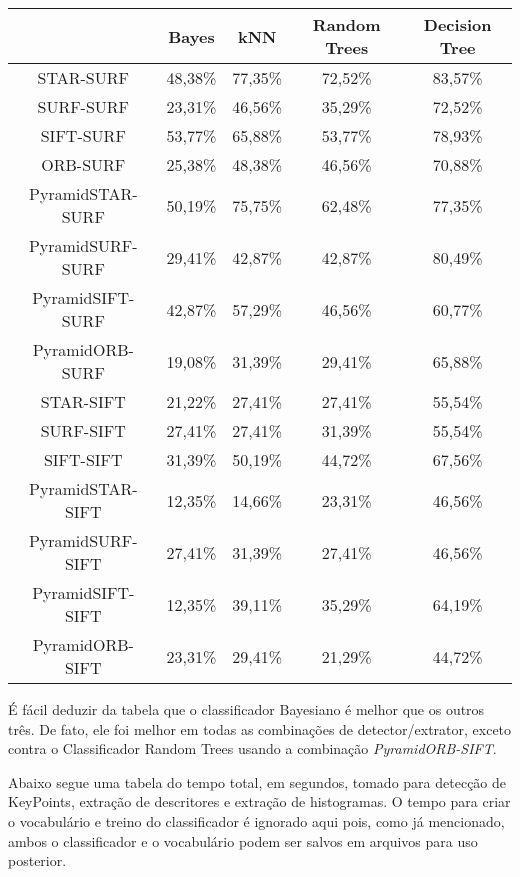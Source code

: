 \documentclass[a4paper,11pt]{article}
\begin{document}
  \vspace{15pt}
  \hspace{-25pt}
  \begin{tabular}{|c|c|c|c|c|}
    \hline
     & Bayes & kNN & Random Trees & Decision Tree \\
    \hline
        STAR-SURF & 48,38\% & 77,35\% & 72,52\% & 83,57\% \\
        SURF-SURF & 23,31\% & 46,56\% & 35,29\% & 72,52\% \\
        SIFT-SURF & 53,77\% & 65,88\% & 53,77\% & 78,93\%\\
        ORB-SURF & 25,38\% & 48,38\% & 46,56\% & 70,88\% \\
        PyramidSTAR-SURF & 50,19\% & 75,75\% & 62,48\% & 77,35\% \\
        PyramidSURF-SURF & 29,41\% & 42,87\% & 42,87\% & 80,49\% \\
        PyramidSIFT-SURF & 42,87\% & 57,29\% & 46,56\% & 60,77\% \\
        PyramidORB-SURF & 19,08\% & 31,39\% & 29,41\% & 65,88\% \\
        STAR-SIFT & 21,22\% & 27,41\% & 27,41\% & 55,54\% \\
        SURF-SIFT & 27,41\% & 27,41\% & 31,39\% & 55,54\% \\
        SIFT-SIFT & 31,39\% & 50,19\% & 44,72\% & 67,56\% \\
        PyramidSTAR-SIFT & 12,35\% & 14,66\% & 23,31\% & 46,56\% \\
        PyramidSURF-SIFT & 27,41\% & 31,39\% & 27,41\% & 46,56\% \\
        PyramidSIFT-SIFT & 12,35\% & 39,11\% & 35,29\% & 64,19\% \\
        PyramidORB-SIFT & 23,31\% & 29,41\% & 21,29\% & 44,72\% \\
        
    \hline
  \end{tabular}
  \bigskip

  É fácil deduzir da tabela que o classificador Bayesiano é melhor que os outros
  três. De fato, ele foi melhor em todas as combinações de detector/extrator,
  exceto contra o Classificador Random Trees usando a combinação
  \textit{PyramidORB-SIFT}.

  Abaixo segue uma tabela do tempo total, em segundos, tomado para detecção de
  KeyPoints, extração de descritores e extração de histogramas. O tempo para
  criar o vocabulário e treino do classificador é ignorado aqui pois, como já
  mencionado, ambos o classificador e o vocabulário podem ser salvos em arquivos
  para uso posterior.
\end{document}
